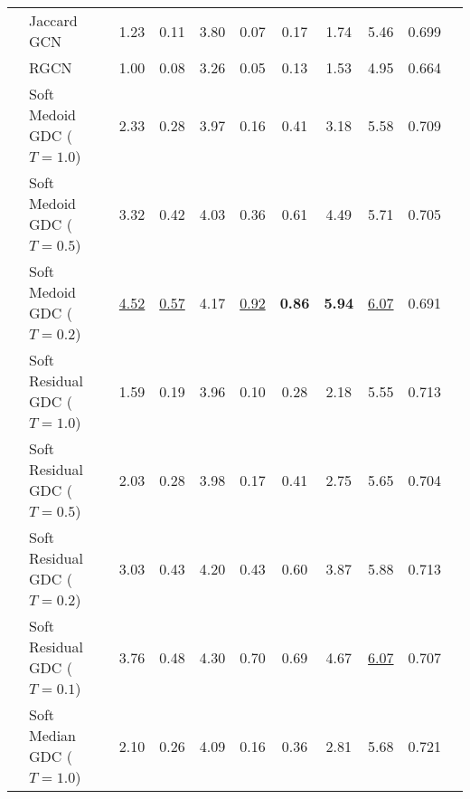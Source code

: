 \documentclass{article} %
\begin{document}
\begin{table}
{\begin{tabular}{llccccccccc}
                             & Jaccard GCN &                         1.23 &              0.11 &              3.80 &                      0.07 &              0.17 &                      1.74 &              5.46 &              0.699 \\
                             & RGCN &                         1.00 &              0.08 &              3.26 &                      0.05 &              0.13 &                      1.53 &              4.95 &              0.664 \\
                             & Soft Medoid GDC ($T=1.0$) &                         2.33 &              0.28 &              3.97 &                      0.16 &              0.41 &                      3.18 &              5.58 &              0.709 \\
                             & Soft Medoid GDC ($T=0.5$) &                         3.32 &              0.42 &              4.03 &                      0.36 &              0.61 &                      4.49 &              5.71 &              0.705 \\
                             & Soft Medoid GDC ($T=0.2$) &             \underline{4.52} &  \underline{0.57} &              4.17 &          \underline{0.92} &     \textbf{0.86} &             \textbf{5.94} &  \underline{6.07} &              0.691 \\
                             & Soft Residual GDC ($T=1.0$) &                         1.59 &              0.19 &              3.96 &                      0.10 &              0.28 &                      2.18 &              5.55 &              0.713 \\
                             & Soft Residual GDC ($T=0.5$) &                         2.03 &              0.28 &              3.98 &                      0.17 &              0.41 &                      2.75 &              5.65 &              0.704 \\
                             & Soft Residual GDC ($T=0.2$) &                         3.03 &              0.43 &              4.20 &                      0.43 &              0.60 &                      3.87 &              5.88 &              0.713 \\
                             & Soft Residual GDC ($T=0.1$) &                         3.76 &              0.48 &              4.30 &                      0.70 &              0.69 &                      4.67 &  \underline{6.07} &              0.707 \\
                             & Soft Median GDC ($T=1.0$) &                         2.10 &              0.26 &              4.09 &                      0.16 &              0.36 &                      2.81 &              5.68 &              0.721 \\

\end{tabular}}
\end{table}
\end{document}
